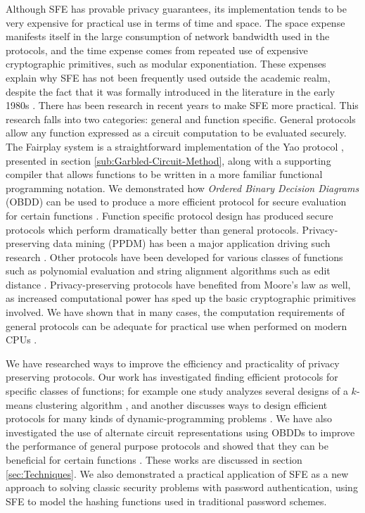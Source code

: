 Although SFE has provable privacy guarantees, its implementation tends
to be very expensive for practical use in terms of time and space.
The space expense manifests itself in the large consumption of network
bandwidth used in the protocols, and the time expense comes from repeated
use of expensive cryptographic primitives, such as modular exponentiation.
These expenses explain why SFE has not been frequently used outside
the academic realm, despite the fact that it was formally
introduced in the literature in the early 1980s \cite{Y82}. There has
been research in recent years to make SFE more practical. This research
falls into two categories: general and function specific. General
protocols allow any function expressed as a circuit computation to
be evaluated securely. The Fairplay system \cite{Fairplay} is a straightforward
implementation of the Yao protocol \cite{Yao86}, presented in section
\ref{sub:Garbled-Circuit-Method}, along with a supporting compiler
that allows functions to be written in a more familiar functional
programming notation. We demonstrated
how \emph{Ordered Binary Decision Diagrams} (OBDD)  can be used to
produce a more efficient protocol for secure evaluation for certain
functions \cite{kruger06}. Function specific protocol design has produced secure protocols
which perform dramatically better than general protocols. Privacy-preserving data mining (PPDM) has been a major application driving
such research \cite{verykios04stateart}. Other protocols have been
developed for various classes of functions such as polynomial evaluation
\cite{naor99otope} and string alignment algorithms such as edit distance
\cite{kruger07}.  Privacy-preserving protocols have benefited from Moore's law as well,
as increased computational power has sped up the basic cryptographic primitives involved.
We have shown that in many
cases, the computation requirements of general protocols
can be adequate for practical use when performed on modern
CPUs \cite{kruger06,kruger10}.

We have researched ways to improve the efficiency and practicality
of privacy preserving protocols. Our work has investigated finding
efficient protocols for specific classes of functions; for example
one study analyzes several designs of a $k$-means clustering algorithm
\cite{kruger05}, and another discusses ways to design efficient protocols
for many kinds of dynamic-programming problems \cite{kruger07}. We
have also investigated the use of alternate circuit representations
using OBDDs to improve the performance of general purpose protocols
and showed that they can be beneficial for certain functions \cite{kruger06}.
These works are discussed in section \ref{sec:Techniques}.
We also demonstrated a practical application of SFE as a new approach
to solving classic security problems with password authentication, using
SFE to model the hashing functions used in traditional password schemes.
\cite{kruger10}

